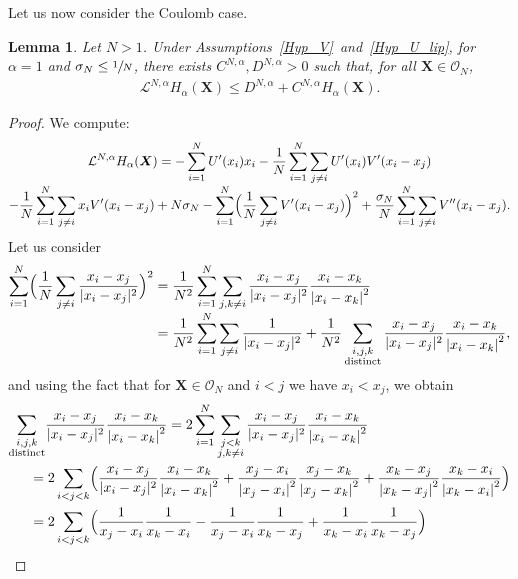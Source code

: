\documentclass[10pt]{amsart}
\newcommand{\bX}{{\boldsymbol{X}}}
\theoremstyle{plain}
\newtheorem{lemma}{Lemma}[section]
\theoremstyle{definition}
\begin{document}
Let us now consider the Coulomb case.
\begin{lemma}\label{lya_alpha_1}
Let $N>1$. Under Assumptions~\ref{Hyp_V}~and~\ref{Hyp_U_lip}, for $\alpha=1$ and $\sigma_N\leq\sfrac{1}{N}$, there exists $C^{N,\alpha}, D^{N,\alpha}>0$ such that, for all $\bX\in\mathcal{O}_N$,
\begin{align*}
\mathcal{L}^{N,\alpha} H_{\alpha}(\bX)\leq D^{N,\alpha}+C^{N,\alpha}H_{\alpha}(\bX).
\end{align*}
\end{lemma}

\begin{proof}
We compute:\vspace*{-7pt}
\begin{multline*}
\mathcal{L}^{N,\alpha} H_{\alpha}(\bX)=-\sum_{i=1}^N U'(x_i)x_i-\frac{1}{N}\sum_{i=1}^N\sum_{j\neq i}U'(x_i)V'(x_i-x_j)\\[-3pt]
-\frac{1}{N}\sum_{i=1}^N\sum_{j\neq i}x_iV'(x_i-x_j)+N\sigma_N-\sum_{i=1}^N\Bigl(\frac{1}{N}\sum_{j\neq i}V'(x_i-x_j)\Bigr)^2+\frac{\sigma_N}{N}\sum_{i=1}^N\sum_{j\neq i}V''(x_i-x_j).
\end{multline*}
Let us consider
\begin{align*}
\sum_{i=1}^N\Bigl(\frac{1}{N}\sum_{j\neq i}\frac{x_i-x_j}{|x_i-x_j|^2}\Bigr)^2&=\frac{1}{N^2}\sum_{i=1}^N\sum_{j,k\neq i}\frac{x_i-x_j}{|x_i-x_j|^2}\frac{x_i-x_k}{\left|x_i-x_k\right|^2}\\[-3pt]
&=\frac{1}{N^2}\sum_{i=1}^N\sum_{j\neq i}\frac{1}{|x_i-x_j|^2}+\frac{1}{N^2}\sum_{\substack{i,j,k\\\text{distinct}}}\frac{x_i-x_j}{|x_i-x_j|^2}\frac{x_i-x_k}{\left|x_i-x_k\right|^2},
\end{align*}
and using the fact that for $\bX\in\mathcal{O}_N$ and $i<j$ we have $x_i<x_j$, we obtain
\begin{align*}
\sum_{\substack{i,j,k\\\text{distinct}}}&\frac{x_i-x_j}{|x_i-x_j|^2}\frac{x_i-x_k}{\left|x_i-x_k\right|^2}
=2\sum_{i=1}^N\sum_{\substack{j<k\\ j,k\neq i}}\frac{x_i-x_j}{|x_i-x_j|^2}\frac{x_i-x_k}{\left|x_i-x_k\right|^2}\\
&\hspace*{-.4cm}=2\sum_{i<j<k}\Bigl(\frac{x_i-x_j}{|x_i-x_j|^2}\frac{x_i-x_k}{\left|x_i-x_k\right|^2}+\frac{x_j-x_i}{\left|x_j-x_i\right|^2}\frac{x_j-x_k}{\left|x_j-x_k\right|^2}+\frac{x_k-x_j}{\left|x_k-x_j\right|^2}\frac{x_k-x_i}{\left|x_k-x_i\right|^2}\Bigr)\\
&\hspace*{-.4cm}=2\sum_{i<j<k}\Bigl(\frac{1}{x_j-x_i}\frac{1}{x_k-x_i}-\frac{1}{x_j-x_i}\frac{1}{x_k-x_j}+\frac{1}{x_k-x_i}\frac{1}{x_k-x_j}\Bigr)\\

\end{align*}
\end{proof}
\end{document}
